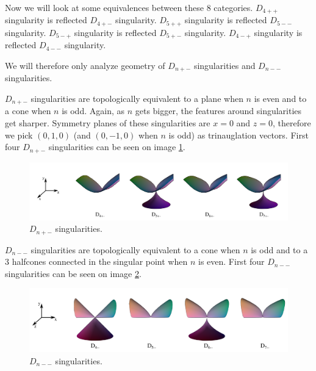 \begin{definition}
Now we will look at some equivalences between these 8 categories.
$D_{4++}$ singularity is reflected $D_{4+-}$ singularity.
$D_{5++}$ singularity is reflected $D_{5--}$ singularity.
$D_{5-+}$ singularity is reflected $D_{5+-}$ singularity.
$D_{4-+}$ singularity is reflected $D_{4--}$ singularity.

We will therefore only analyze geometry of $D_{n+-}$ singularities and
$D_{n--}$ singularities.

$D_{n+-}$ singularities are topologically equivalent to a plane when $n$ is
even and to a cone when $n$ is odd. Again, as $n$ gets bigger, the features
around singularities get sharper. Symmetry planes of these singularities
are $x=0$ and $z=0$, therefore we pick $(0, 1, 0)$ (and $(0, -1, 0)$ when $n$ is odd)
as trinauglation vectors. First four $D_{n+-}$ singularities can be seen on
image \ref{img:7}.

\begin{figure}
    \centerline{\includegraphics[width=1\textwidth]{images/img7}}
    \caption[$D_{n+-}$ singularities]
    {$D_{n+-}$ singularities. \cite{singsurf}}
    \label{img:7}
\end{figure}


$D_{n--}$ singularities are topologically equivalent to a cone when $n$ is
odd and to a 3 halfcones connected in the singular point when $n$ is even.
First four $D_{n--}$ singularities can be seen on image \ref{img:8}.

\begin{figure}
    \centerline{\includegraphics[width=1\textwidth]{images/img8}}
    \caption[$D_{n--}$ singularities]
    {$D_{n--}$ singularities. \cite{singsurf}}
    \label{img:8}
\end{figure}


\end{definition}
